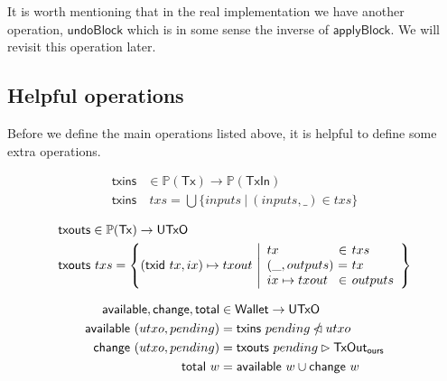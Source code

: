 \documentclass{article}
\newcommand{\powerset}[1]{\mathbb{P}(#1)}
\newcommand{\restrictdom}{\lhd}
\newcommand{\subtractdom}{\mathbin{\slashed{\restrictdom}}}
\newcommand{\restrictrange}{\rhd}
\begin{document}
It is worth mentioning that in the real implementation we have another
operation, $\mathsf{undoBlock}$ which is in some sense the inverse of
$\mathsf{applyBlock}$. We will revisit this operation later.


\subsection{Helpful operations}

Before we define the main operations listed above, it is helpful to define some
extra operations.

\begin{equation}
\begin{split}
\mathsf{txins}& \in \powerset{\mathsf{Tx}} \to \powerset{\mathsf{TxIn}} \\
\mathsf{txins}& ~ txs = \bigcup \{ inputs ~|~ (inputs, \_) \in txs \}
\end{split}
\end{equation}

\begin{equation}
\begin{split}
\mathsf{txouts}&\in \powerset{\mathsf{Tx}} \to \mathsf{UTxO} \\
\mathsf{txouts}& ~ txs =
  \left\{ (\mathsf{txid} ~ tx, ix) \mapsto txout ~
  \middle| \begin{array}{l@{~}c@{~}l}
             tx & \in & txs \\
             (\_, outputs) & = & tx \\
             ix \mapsto txout & \in & outputs
           \end{array}
  \right\}
\end{split}
\end{equation}

\begin{equation}
\begin{split}
\mathsf{available}, \mathsf{change}, \mathsf{total} & \in \mathsf{Wallet} \to \mathsf{UTxO} \\
\mathsf{available} ~ (utxo, pending) & = \mathsf{txins} ~ pending \subtractdom utxo \\
\mathsf{change} ~ (utxo, pending) & =
    \mathsf{txouts} ~ pending \restrictrange \mathsf{TxOut_{ours}} \\
\mathsf{total} ~ w & = \mathsf{available} ~ w \cup \mathsf{change} ~ w \\
\end{split}
\end{equation}
\end{document}
